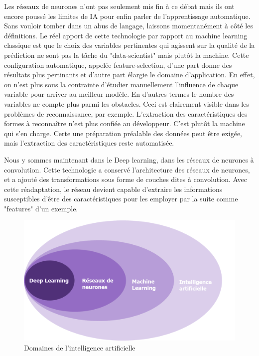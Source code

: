 Les réseaux de neurones n'ont pas seulement mis fin à ce débat mais ils ont encore poussé les limites de IA pour enfin parler de l'apprentissage automatique. Sans vouloir tomber dans un abus de langage, laissons momentanément à côté les définitions. Le réel apport de cette technologie par rapport au machine learning classique est que le choix des variables pertinentes qui agissent sur la qualité de la prédiction ne sont pas la tâche du "data-scientist" mais plutôt la machine. Cette configuration automatique, appelée feature-selection, d'une part donne des résultats plus pertinants et d'autre part élargie le domaine d'application. En effet, on n'est plus sous la contrainte d'étudier manuellement l'influence de chaque variable pour arriver au meilleur modèle. En d'autres termes le nombre des variables ne compte plus parmi les obstacles. Ceci est clairement visible dans les problèmes de reconnaissance, par exemple. L'extraction des caractéristiques des formes à reconnaître n'est plus confiée au développeur. C'est plutôt la machine qui s'en charge. Certe une préparation préalable des données peut être exigée, mais l'extraction des caractéristiques reste automatisée.

Nous y sommes maintenant dans le Deep learning, dans les réseaux de neurones à convolution. Cette technologie a conservé l'architecture des réseaux de neurones, et a ajouté des transformations sous forme de couches dites à convolution. Avec cette réadaptation, le réseau devient capable d'extraire les informations susceptibles d'être des caractéristiques pour les employer par la suite comme "features" d'un exemple.


\begin{figure}[H]
\centering
\includegraphics[width=12cm]{figures/AP/image-1-1.png}
\caption{Domaines de l'intelligence artificielle}
\end{figure}

